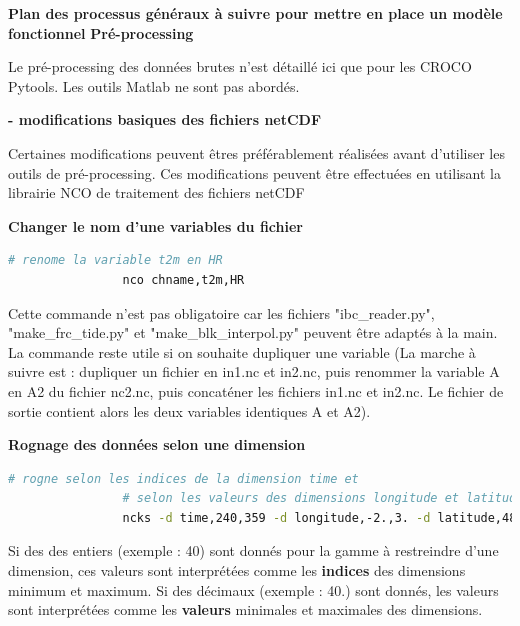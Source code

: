\documentclass[10pt,a4paper,titlepage]{article}
\begin{document}
\begin{processEnv}{\textbf{Plan des processus généraux à suivre pour mettre en place un modèle fonctionnel}}
        {\color{workColor}\textbf{Pré-processing}}
        
        Le pré-processing des données brutes n'est détaillé ici que pour les CROCO Pytools. Les outils Matlab ne sont pas abordés.
        
        \textbf{- modifications basiques des fichiers netCDF}
        
        Certaines modifications peuvent êtres préférablement réalisées avant d'utiliser les outils de pré-processing. Ces modifications peuvent être effectuées en utilisant la librairie NCO de traitement des fichiers netCDF
        
        \begin{codeEnv}{\textbf{Changer le nom d'une variables du fichier}}
            \begin{lstlisting}[language=bash]
                # renome la variable t2m en HR
                nco chname,t2m,HR
            \end{lstlisting}
        \end{codeEnv}
        
        Cette commande n'est pas obligatoire car les fichiers "ibc\_reader.py", "make\_frc\_tide.py" et "make\_blk\_interpol.py" peuvent être adaptés à la main.
        La commande reste utile si on souhaite dupliquer une variable (La marche à suivre est : dupliquer un fichier en in1.nc et in2.nc, puis renommer la variable A en A2 du fichier nc2.nc, puis concaténer les fichiers in1.nc et in2.nc. Le fichier de sortie contient alors les deux variables identiques A et A2).
        
        \begin{codeEnv}{\textbf{Rognage des données selon une dimension}}
            \begin{lstlisting}[language=bash]
                # rogne selon les indices de la dimension time et
                # selon les valeurs des dimensions longitude et latitude
                ncks -d time,240,359 -d longitude,-2.,3. -d latitude,48.,50. in.nc out.nc
            \end{lstlisting}
        \end{codeEnv}
        
        Si des des entiers (exemple : 40) sont donnés pour la gamme à restreindre d'une dimension, ces valeurs sont interprétées comme les \textbf{indices} des dimensions minimum et maximum. Si des décimaux (exemple : 40.) sont donnés, les valeurs sont interprétées comme les \textbf{valeurs }minimales et maximales des dimensions.
        

\end{processEnv}
\end{document}
